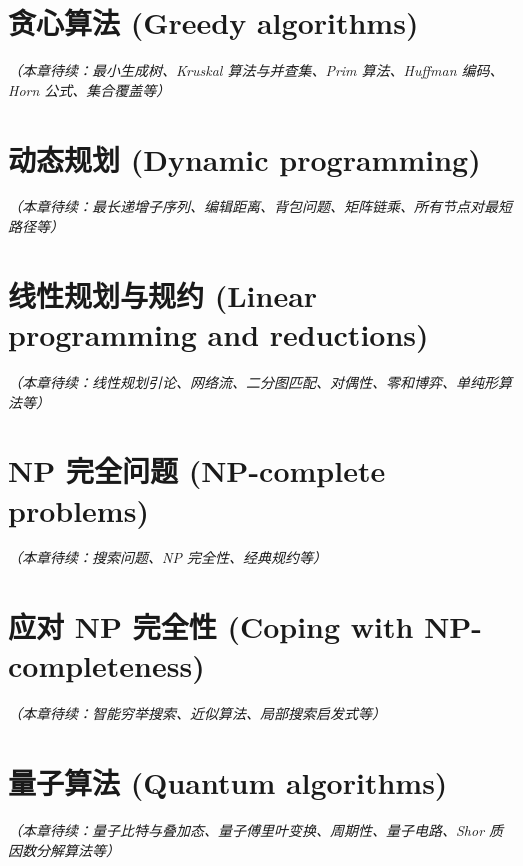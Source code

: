 \documentclass[11pt,a4paper,openany]{book}
\theoremstyle{definition}
\begin{document}
\chapter{贪心算法 (Greedy algorithms)}
\textit{（本章待续：最小生成树、Kruskal 算法与并查集、Prim 算法、Huffman 编码、Horn 公式、集合覆盖等）}

\chapter{动态规划 (Dynamic programming)}
\textit{（本章待续：最长递增子序列、编辑距离、背包问题、矩阵链乘、所有节点对最短路径等）}

\chapter{线性规划与规约 (Linear programming and reductions)}
\textit{（本章待续：线性规划引论、网络流、二分图匹配、对偶性、零和博弈、单纯形算法等）}

\chapter{NP 完全问题 (NP-complete problems)}
\textit{（本章待续：搜索问题、NP 完全性、经典规约等）}

\chapter{应对 NP 完全性 (Coping with NP-completeness)}
\textit{（本章待续：智能穷举搜索、近似算法、局部搜索启发式等）}

\chapter{量子算法 (Quantum algorithms)}
\textit{（本章待续：量子比特与叠加态、量子傅里叶变换、周期性、量子电路、Shor 质因数分解算法等）}

\backmatter
\end{document}
